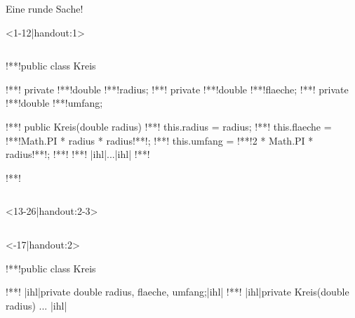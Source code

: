 \iffull
\begin{frame}[c,fragile]{Eine runde Sache!}
\begin{onlyenv}<1-12|handout:1>
\begin{columns}[c,onlytextwidth]
\footnotesize{}\medskip\par
{}
\SetupLstHl
\begin{plainjava}
!**!public class Kreis {
!**!   private !**!double !**!radius;
!**!   private !**!double !**!flaeche;
!**!   private !**!double !**!umfang;

!**!   public Kreis(double radius) {
!**!       this.radius = radius;
!**!       this.flaeche = !**!Math.PI * radius * radius!**!;
!**!       this.umfang = !**!2 * Math.PI * radius!**!;
!**!   }
!**!   |ihl|...|ihl|
!**!}!**!
\end{plainjava}
\end{columns}
\end{onlyenv}
\begin{onlyenv}<13-26|handout:2-3>
\begin{columns}[c,onlytextwidth]
\footnotesize{}\medskip\par
{}
\SetupLstHl
\begin{onlyenv}<-17|handout:2>
\begin{plainjava}
!**!public class Kreis {
!**!   |ihl|private double radius, flaeche, umfang;|ihl|
!**!   |ihl|private Kreis(double radius)  { ... }|ihl|

}
\end{plainjava}
\end{onlyenv}
\end{columns}
\end{onlyenv}
\end{frame}
